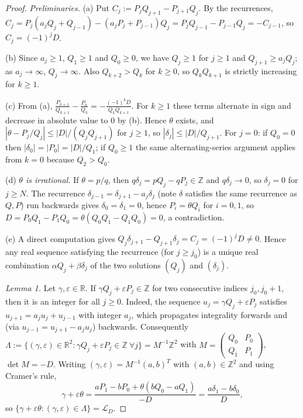 \documentclass[11pt]{amsart}
\theoremstyle{remark}
\newcommand{\Z}{\mathbb{Z}}
\newcommand{\R}{\mathbb{R}}
\newcommand{\Q}{\mathbb{Q}}
\newcommand{\LL}{\mathcal{L}}
\begin{document}
\begin{proof}
\emph{Preliminaries.}
(a) Put $C_j:=P_jQ_{j+1}-P_{j+1}Q_j$. By the recurrences,
$C_j=P_j(a_jQ_j+Q_{j-1})-(a_jP_j+P_{j-1})Q_j=P_jQ_{j-1}-P_{j-1}Q_j=-C_{j-1}$,
so $C_j=(-1)^jD$.

(b) Since $a_j\ge1$, $Q_1\ge1$ and $Q_0\ge0$, we have $Q_j\ge1$ for $j\ge1$ and
$Q_{j+1}\ge a_jQ_j$; as $a_j\to\infty$, $Q_j\to\infty$. Also $Q_{k+2}>Q_k$ for $k\ge0$,
so $Q_kQ_{k+1}$ is strictly increasing for $k\ge1$.

(c) From (a), $\frac{P_{k+1}}{Q_{k+1}}-\frac{P_k}{Q_k}=-\frac{(-1)^kD}{Q_kQ_{k+1}}$. For $k\ge1$ these
terms alternate in sign and decrease in absolute value to $0$ by (b). Hence $\theta$ exists, and
$|\theta-P_j/Q_j|\le|D|/(Q_jQ_{j+1})$ for $j\ge1$, so $|\delta_j|\le|D|/Q_{j+1}$.
For $j=0$: if $Q_0=0$ then $|\delta_0|=|P_0|=|D|/Q_1$; if $Q_0\ge1$ the same alternating-series
argument applies from $k=0$ because $Q_2>Q_0$.

(d) \emph{$\theta$ is irrational.} If $\theta=p/q$, then $q\delta_j=pQ_j-qP_j\in\Z$ and $q\delta_j\to0$, so
$\delta_j=0$ for $j\ge N$. The recurrence $\delta_{j-1}=\delta_{j+1}-a_j\delta_j$ (note $\delta$
satisfies the same recurrence as $Q,P$) run backwards gives $\delta_0=\delta_1=0$, hence
$P_i=\theta Q_i$ for $i=0,1$, so $D=P_0Q_1-P_1Q_0=\theta(Q_0Q_1-Q_1Q_0)=0$, a contradiction.

(e) A direct computation gives $Q_j\delta_{j+1}-Q_{j+1}\delta_j=C_j=(-1)^jD\ne0$. Hence any real
sequence satisfying the recurrence (for $j\ge j_0$) is a unique real combination
$\alpha Q_j+\beta\delta_j$ of the two solutions $(Q_j)$ and $(\delta_j)$.

\emph{Lemma 1.} Let $\gamma,\varepsilon\in\R$. If $\gamma Q_j+\varepsilon P_j\in\Z$ for two
consecutive indices $j_0,j_0+1$, then it is an integer for all $j\ge0$. Indeed, the sequence
$u_j=\gamma Q_j+\varepsilon P_j$ satisfies $u_{j+1}=a_ju_j+u_{j-1}$ with integer $a_j$, which
propagates integrality forwards and (via $u_{j-1}=u_{j+1}-a_ju_j$) backwards.
Consequently
$\Lambda:=\{(\gamma,\varepsilon)\in\R^2:\gamma Q_j+\varepsilon P_j\in\Z\ \forall j\}=M^{-1}\Z^2$
with $M=\begin{pmatrix}Q_0&P_0\\Q_1&P_1\end{pmatrix}$, $\det M=-D$. Writing
$(\gamma,\varepsilon)=M^{-1}(a,b)^{T}$ with $(a,b)\in\Z^2$ and using Cramer's rule,
\[
\gamma+\varepsilon\theta=\frac{aP_1-bP_0+\theta(bQ_0-aQ_1)}{-D}=\frac{a\delta_1-b\delta_0}{D},
\]
so $\{\gamma+\varepsilon\theta:(\gamma,\varepsilon)\in\Lambda\}=\LL_D$.


\end{proof}
\end{document}
